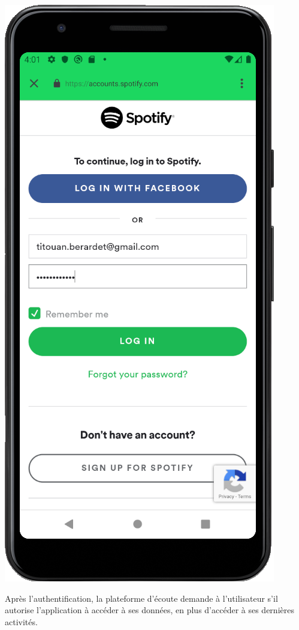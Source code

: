 \documentclass[12pt, openany]{report}
\begin{document}
    \includegraphics[scale=0.5]{images/authentification_exemple.png}
    
    \newpage
    
    Après l'authentification, la plateforme d'écoute demande à l'utilisateur s'il autorise l'application à accéder à ses données, en plus d'accéder à ses dernières activités.
    \\
    \\
    
\end{document}
